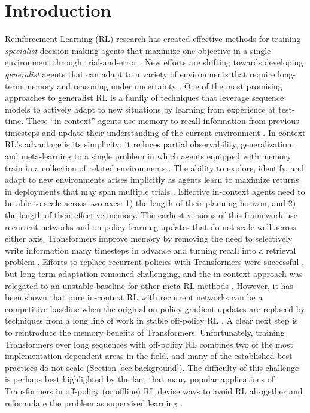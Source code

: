 \documentclass{article}
\begin{document}
\section{Introduction}
\label{sec:intro}
Reinforcement Learning (RL) research has created effective methods for training \textit{specialist} decision-making agents that maximize one objective in a single environment through trial-and-error \cite{badia2020agent57, berner2019dota, mnih2015human, silver2018general, vinyals2019grandmaster}. New efforts are shifting towards developing \textit{generalist} agents that can adapt to a variety of environments that require long-term memory and reasoning under uncertainty \cite{kirk2022survey, fan2022minedojo, team2023human, reed2022generalist}. One of the most promising approaches to generalist RL is a family of techniques that leverage sequence models to actively adapt to new situations by learning from experience at test-time. These ``in-context'' agents use memory to recall information from previous timesteps and update their understanding of the current environment \cite{wang2016learning, duan2016rl}. In-context RL's advantage is its simplicity: it reduces partial observability, generalization, and meta-learning to a single problem in which agents equipped with memory train in a collection of related environments \cite{beck2023survey, zintgraf2022fast, ghosh2021generalization}. The ability to explore, identify, and adapt to new environments arises implicitly as agents learn to maximize returns in deployments that may span multiple trials \cite{zintgraf2022fast, ortega2019meta, botvinick2019reinforcement}.
Effective in-context agents need to be able to scale across two axes: 1) the length of their planning horizon, and 2) the length of their effective memory. The earliest versions of this framework \cite{wang2016learning, duan2016rl, stadie2018some} use recurrent networks and on-policy learning updates that do not scale well across either axis. Transformers \cite{vaswani2017attention} improve memory by removing the need to selectively write information many timesteps in advance and turning recall into a retrieval problem \cite{rae2020transformers}. Efforts to replace recurrent policies with Transformers were successful \cite{melo2022transformers, mishra2017simple}, but long-term adaptation remained challenging, and the in-context approach was relegated to an unstable baseline for other meta-RL methods \cite{beck2023survey}. However, it has been shown that pure in-context RL with recurrent networks can be a competitive baseline when the original on-policy gradient updates are replaced by techniques from a long line of work in stable off-policy RL \cite{ni2022recurrent, fakoor2019meta}. A clear next step is to reintroduce the memory benefits of Transformers. Unfortunately, training Transformers over long sequences with off-policy RL combines two of the most implementation-dependent areas in the field, and many of the established best practices do not scale (Section \ref{sec:background}). The difficulty of this challenge is perhaps best highlighted by the fact that many popular applications of Transformers in off-policy (or offline) RL devise ways to avoid RL altogether and reformulate the problem as supervised learning \cite{chen2021decision, lee2022multi, janner2021reinforcement, zheng2022online, laskin2022context, shi2023cross}.
\end{document}
